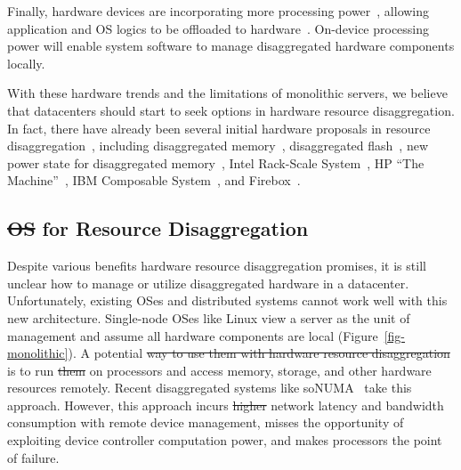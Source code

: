 \documentclass[10pt,times,twocolumn]{z2-article}
\providecommand{\DIFaddtex}[1]{{\protect\color{blue}\uwave{#1}}} %
\providecommand{\DIFdeltex}[1]{{\protect\color{red}\sout{#1}}}                      %
\providecommand{\DIFaddbegin}{} %
\providecommand{\DIFaddend}{} %
\providecommand{\DIFdelbegin}{} %
\providecommand{\DIFdelend}{} %
\providecommand{\DIFadd}[1]{\texorpdfstring{\DIFaddtex{#1}}{#1}} %
\providecommand{\DIFdel}[1]{\texorpdfstring{\DIFdeltex{#1}}{}} %
\newcommand{\DIFscaledelfig}{0.5}
\newlength{\DIFdelgraphicswidth} %
\newlength{\DIFdelgraphicsheight} %
\newcommand{\DIFaddincludegraphics}[2][]{{\color{blue}\fbox{\DIFOincludegraphics[#1]{#2}}}} %
\newcommand{\DIFdelincludegraphics}[2][]{%
\sbox{\DIFdelgraphicsbox}{\DIFOincludegraphics[#1]{#2}}%
\settoboxwidth{\DIFdelgraphicswidth}{\DIFdelgraphicsbox} %
\settoboxtotalheight{\DIFdelgraphicsheight}{\DIFdelgraphicsbox} %
\scalebox{\DIFscaledelfig}{%
\parbox[b]{\DIFdelgraphicswidth}{\usebox{\DIFdelgraphicsbox}\\[-\baselineskip] \rule{\DIFdelgraphicswidth}{0em}}\llap{\resizebox{\DIFdelgraphicswidth}{\DIFdelgraphicsheight}{%
\setlength{\unitlength}{\DIFdelgraphicswidth}%
\begin{picture}(1,1)%
\thicklines\linethickness{2pt} %
{\color[rgb]{1,0,0}\put(0,0){\framebox(1,1){}}}%
{\color[rgb]{1,0,0}\put(0,0){\line( 1,1){1}}}%
{\color[rgb]{1,0,0}\put(0,1){\line(1,-1){1}}}%
\end{picture}%
}\hspace*{3pt}}} %
} %
\DeclareRobustCommand{\DIFaddbegin}{\DIFOaddbegin \let\includegraphics\DIFaddincludegraphics} %
\DeclareRobustCommand{\DIFaddend}{\DIFOaddend \let\includegraphics\DIFOincludegraphics} %
\DeclareRobustCommand{\DIFdelbegin}{\DIFOdelbegin \let\includegraphics\DIFdelincludegraphics} %
\DeclareRobustCommand{\DIFdelend}{\DIFOaddend \let\includegraphics\DIFOincludegraphics} %
\begin{document}
{Finally, hardware devices are incorporating more processing power~\cite{Ahn15-PIM,Bojnordi12,Mellanox-SmartNIC,Mellanox-SmartNIC2,Agilio-SmartNIC,Junwhan-ISCA17},
allowing application and OS logics to be offloaded to hardware~\cite{Willow,Kaufmann16-ASPLOS}.
On-device processing power will enable system software to manage disaggregated hardware components locally.

With these hardware trends and the limitations of monolithic servers,
we believe that datacenters should start to seek options in hardware resource disaggregation.
In fact, there have already been several initial hardware proposals in resource disaggregation~\cite{OCP},
including disaggregated memory~\cite{Lim09-disaggregate,Scaleout-numa}, 
disaggregated flash~\cite{FlashDisaggregation,ReFlex},
new power state for disaggregated memory~\cite{Nitu18-EUROSYS},
Intel Rack-Scale System~\cite{IntelRackScale}, 
HP ``The Machine''~\cite{HP-TheMachine,HP-MemoryOS}, 
IBM Composable System~\cite{IBM-Composable},
and Firebox~\cite{FireBox-FASTKeynote}.

\subsection{\DIFdelbegin \DIFdel{OS }\DIFdelend \DIFaddbegin \DIFadd{OSes }\DIFaddend for Resource Disaggregation}
Despite various benefits hardware resource disaggregation promises, 
it is still unclear how to manage or utilize disaggregated hardware in a datacenter.
Unfortunately, existing OSes and distributed systems cannot work well with this new architecture.
Single-node OSes like Linux view a server as the unit of management and assume all hardware components are local (Figure~\ref{fig-monolithic}).
A potential \DIFdelbegin \DIFdel{way to use them with hardware resource disaggregation }\DIFdelend \DIFaddbegin \DIFadd{approach }\DIFaddend is to run \DIFdelbegin \DIFdel{them }\DIFdelend \DIFaddbegin \DIFadd{these OSes }\DIFaddend on processors
and access memory, storage, and other hardware resources remotely.
Recent disaggregated systems like soNUMA~\cite{Scaleout-numa} take this approach.
However, this approach incurs \DIFdelbegin \DIFdel{higher }\DIFdelend \DIFaddbegin \DIFadd{high }\DIFaddend network latency and bandwidth consumption with remote device management,
misses the opportunity of exploiting device controller computation power,
and makes processors the point of failure.

}
\end{document}
